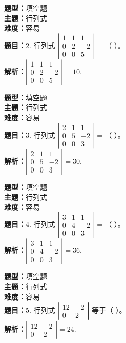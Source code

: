 \documentclass{ctexart}
\newenvironment{question}[5]{%
	\noindent\textbf{题型：}#1\\
	\textbf{主题：}#2\\
	\textbf{难度：}#3\\
	\textbf{题目：}#4\\
	\textbf{解析：}#5\\
	\vspace{1em}
}{}
\begin{document}
\begin{question}
	{填空题}
	{行列式}
	{容易}
	{2. 行列式 $\left|\begin{array}{ccc}1 & 1 & 1 \\ 0 & 2 & -2 \\ 0 & 0 & 5\end{array}\right|=$（ ）。}
	{$\left|\begin{array}{ccc}1 & 1 & 1 \\ 0 & 2 & -2 \\ 0 & 0 & 5\end{array}\right|=10$.}
\end{question}

\begin{question}
	{填空题}
	{行列式}
	{容易}
	{3. 行列式 $\left|\begin{array}{ccc}2 & 1 & 1 \\ 0 & 5 & -2 \\ 0 & 0 & 3\end{array}\right|=$（ ）。}
	{$\left|\begin{array}{ccc}2 & 1 & 1 \\ 0 & 5 & -2 \\ 0 & 0 & 3\end{array}\right|=30$.}
\end{question}

\begin{question}
	{填空题}
	{行列式}
	{容易}
	{4. 行列式 $\left|\begin{array}{ccc}3 & 1 & 1 \\ 0 & 4 & -2 \\ 0 & 0 & 3\end{array}\right|=$（ ）。}
	{$\left|\begin{array}{ccc}3 & 1 & 1 \\ 0 & 4 & -2 \\ 0 & 0 & 3\end{array}\right|=36$.}
\end{question}

\begin{question}
	{填空题}
	{行列式}
	{容易}
	{5. 行列式 $\left|\begin{array}{cc}12 & -2 \\ 0 & 2\end{array}\right|$ 等于（ ）。}
	{$\left|\begin{array}{cc}12 & -2 \\ 0 & 2\end{array}\right|=24$.}
\end{question}
\end{document}
